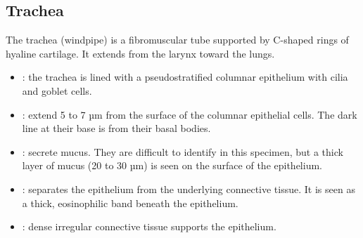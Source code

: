 \subsection{Trachea}
The trachea (windpipe) is a fibromuscular tube supported by C-shaped rings of hyaline cartilage. It extends from the larynx toward the lungs.
\begin{center}
\end{center}
\begin{multicols}{2}
\begin{itemize}
  \item {}:  the trachea is lined with a pseudostratified columnar epithelium with cilia and goblet cells. 
  
  \begin{center}
  \end{center}
  
  \item {}: extend 5 to 7 µm from the surface of the columnar epithelial cells. The dark line at their base is from their basal bodies.
  
  \begin{center}
  \end{center}
  
  \item {}: secrete mucus. They are difficult to identify in this specimen, but a thick layer of mucus (20 to 30 µm) is seen on the surface of the epithelium.
  
  \begin{center}
  \end{center}
  
  \item {}: separates the epithelium from the underlying connective tissue. It is seen as a thick, eosinophilic band beneath the epithelium.
  
  \begin{center}
  \end{center}
  
  \item {}: dense irregular connective tissue supports the epithelium. 
  
  \begin{center}
  \end{center}
  

\end{itemize}
\end{multicols}
